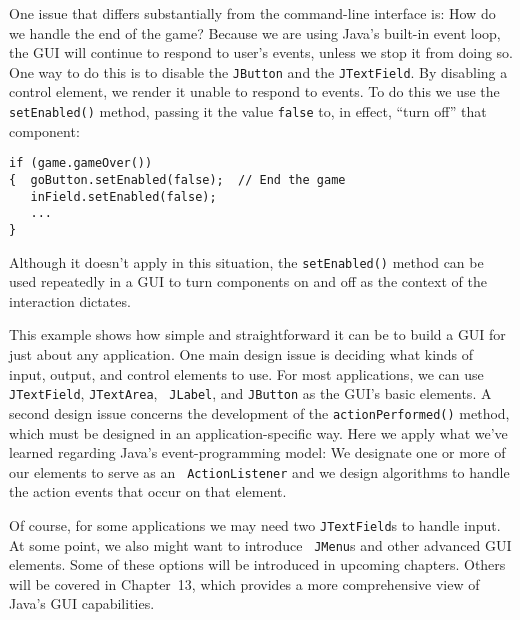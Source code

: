 One issue that differs substantially from the command-line interface is:
How do we handle the end of the game?  Because we are using Java's
built-in event loop, the GUI will continue to respond to user's events,
unless we stop it from doing so. One way to do this is to disable the
{\tt JButton} and the {\tt JTextField}. By disabling a control element,
we render it unable to respond to events. To do this we use the
{\tt setEnabled()} method, passing it the value {\tt false} to, in
effect, ``turn off'' that component:

\begin{jjjlisting}
\begin{lstlisting}
if (game.gameOver()) 
{  goButton.setEnabled(false);  // End the game
   inField.setEnabled(false);
   ...
}
\end{lstlisting}
\end{jjjlisting}

\noindent Although it doesn't apply in this situation, the {\tt setEnabled()}
method can be used repeatedly in a GUI to turn components on and off
as the context of the interaction dictates.

This example shows how simple and straightforward it can be to build a
GUI for just about any application. One main design issue is
deciding what kinds of input, output, and control elements to use. For
most applications, we can use {\tt JTextField}, {\tt JTextArea}, {\tt
JLabel}, and {\tt JButton} as the GUI's basic elements.  A second
design issue concerns the development of the {\tt actionPerformed()}
method, which must be designed in an application-specific way.  Here
we apply what we've learned regarding Java's event-programming model:
We designate one or more of our elements to serve as an {\tt
ActionListener} and we design algorithms to handle the action events
that occur on that element.

Of course, for some applications we may need two {\tt JTextField}s to
handle input. At some point, we also might want to introduce {\tt
JMenu}s and other advanced GUI elements. Some of these options will be
introduced in upcoming chapters. Others will be covered in Chapter~13,
which provides a more comprehensive view of Java's GUI capabilities.




